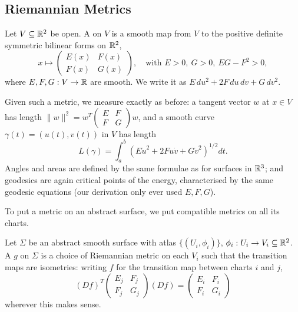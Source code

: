 \documentclass[a4paper]{scrartcl}
\begin{document}
\subsection{Riemannian Metrics}

\begin{definition}
    Let $V \subseteq \mathbb{R}^2$ be open. A  on $V$ is a smooth map from $V$ to the positive definite symmetric bilinear forms on $\mathbb{R}^2$,
    $$
    x \mapsto \begin{pmatrix} E(x) & F(x) \\ F(x) & G(x) \end{pmatrix}, \quad \text{with } E > 0,\ G > 0,\ EG - F^2 > 0,
    $$
    where $E, F, G: V \rightarrow \mathbb{R}$ are smooth. We write it as $E \, du^2 + 2F\,du\,dv + G\,dv^2$.
\end{definition}

Given such a metric, we measure exactly as before: a tangent vector $w$ at $x \in V$ has length
$\|w\|^2 = w^T \left(\begin{smallmatrix} E & F \\ F & G\end{smallmatrix}\right) w$, and a smooth curve $\gamma(t) = (u(t), v(t))$ in $V$ has length
$$
L(\gamma) = \int_a^b \left(E \dot u^2 + 2F \dot u \dot v + G \dot v^2\right)^{1/2} dt.
$$
Angles and areas are defined by the same formulae as for surfaces in $\mathbb{R}^3$; and geodesics are again critical points of the energy, characterised by the same geodesic equations (our derivation only ever used $E, F, G$).

To put a metric on an abstract surface, we put compatible metrics on all its charts.

\begin{definition}
    Let $\Sigma$ be an abstract smooth surface with atlas $\{(U_i, \phi_i)\}$, $\phi_i: U_i \rightarrow V_i \subseteq \mathbb{R}^2$. A  $g$ on $\Sigma$ is a choice of Riemannian metric on each $V_i$ such that the transition maps are isometries: writing $f$ for the transition map between charts $i$ and $j$,
    $$
    (Df)^T \begin{pmatrix} E_j & F_j \\ F_j & G_j\end{pmatrix} (Df) = \begin{pmatrix} E_i & F_i \\ F_i & G_i \end{pmatrix}
    $$
    wherever this makes sense.
\end{definition}
\end{document}

